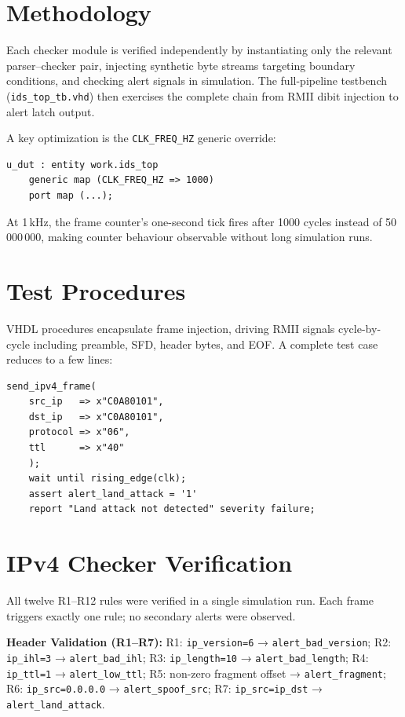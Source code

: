 \section{Methodology}
Each checker module is verified independently by instantiating only the relevant parser--checker pair, injecting synthetic byte streams targeting boundary conditions, and checking alert signals in simulation. The full-pipeline testbench (\texttt{ids\_top\_tb.vhd}) then exercises the complete chain from RMII dibit injection to alert latch output.

A key optimization is the \texttt{CLK\_FREQ\_HZ} generic override:
\begin{lstlisting}[caption={Generic override in the testbench}]
	u_dut : entity work.ids_top
	generic map (CLK_FREQ_HZ => 1000)
	port map (...);
\end{lstlisting}
At 1\,kHz, the frame counter's one-second tick fires after 1000 cycles instead of 50\,000\,000, making counter behaviour observable without long simulation runs.

\section{Test Procedures}
VHDL procedures encapsulate frame injection, driving RMII signals cycle-by-cycle including preamble, SFD, header bytes, and EOF. A complete test case reduces to a few lines:
\begin{lstlisting}[caption={Injecting a land attack}]
	send_ipv4_frame(
	src_ip   => x"C0A80101",
	dst_ip   => x"C0A80101",
	protocol => x"06",
	ttl      => x"40"
	);
	wait until rising_edge(clk);
	assert alert_land_attack = '1'
	report "Land attack not detected" severity failure;
\end{lstlisting}

\section{IPv4 Checker Verification}
All twelve R1--R12 rules were verified in a single simulation run. Each frame triggers exactly one rule; no secondary alerts were observed.

\textbf{Header Validation (R1--R7):}
R1: \texttt{ip\_version=6} → \texttt{alert\_bad\_version};
R2: \texttt{ip\_ihl=3} → \texttt{alert\_bad\_ihl};
R3: \texttt{ip\_length=10} → \texttt{alert\_bad\_length};
R4: \texttt{ip\_ttl=1} → \texttt{alert\_low\_ttl};
R5: non-zero fragment offset → \texttt{alert\_fragment};
R6: \texttt{ip\_src=0.0.0.0} → \texttt{alert\_spoof\_src};
R7: \texttt{ip\_src=ip\_dst} → \texttt{alert\_land\_attack}.

